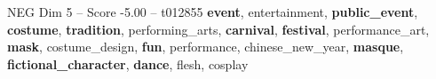 \begin{textsample}{NEG Dim 5 – Score -5.00 – t012855}  \label{ex:f5_neg_039}
\textbf{event}, entertainment, \textbf{public\_event}, \textbf{costume}, \textbf{tradition}, performing\_arts, \textbf{carnival}, \textbf{festival}, performance\_art, \textbf{mask}, costume\_design, \textbf{fun}, performance, chinese\_new\_year, \textbf{masque}, \textbf{fictional\_character}, \textbf{dance}, flesh, cosplay

\end{textsample}
